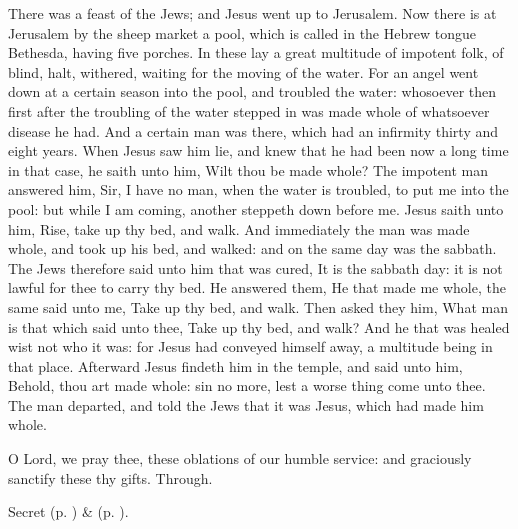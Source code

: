  There was a feast of the Jews; and Jesus went up to Jerusalem. Now there is at Jerusalem by the sheep market a pool, which is called in the Hebrew tongue Bethesda, having five porches. In these lay a great multitude of impotent folk, of blind, halt, withered, waiting for the moving of the water. For an angel went down at a certain season into the pool, and troubled the water: whosoever then first after the troubling of the water stepped in was made whole of whatsoever disease he had. And a certain man was there, which had an infirmity thirty and eight years. When Jesus saw him lie, and knew that he had been now a long time in that case, he saith unto him, Wilt thou be made whole? The impotent man answered him, Sir, I have no man, when the water is troubled, to put me into the pool: but while I am coming, another steppeth down before me. Jesus saith unto him, Rise, take up thy bed, and walk. And immediately the man was made whole, and took up his bed, and walked: and on the same day was the sabbath. The Jews therefore said unto him that was cured, It is the sabbath day: it is not lawful for thee to carry thy bed. He answered them, He that made me whole, the same said unto me, Take up thy bed, and walk. Then asked they him, What man is that which said unto thee, Take up thy bed, and walk? And he that was healed wist not who it was: for Jesus had conveyed himself away, a multitude being in that place. Afterward Jesus findeth him in the temple, and said unto him, Behold, thou art made whole: sin no more, lest a worse thing come unto thee. The man departed, and told the Jews that it was Jesus, which had made him whole.


\clearpage
\secret
{} O Lord, we pray thee, these oblations of our humble service: and graciously sanctify these thy gifts. Through.


\begin{rubric}
     Secret  (p. \pageref{AshWednesdayMassSecret}) \&   (p. \pageref{SPLivingDeparted}).
\end{rubric}


